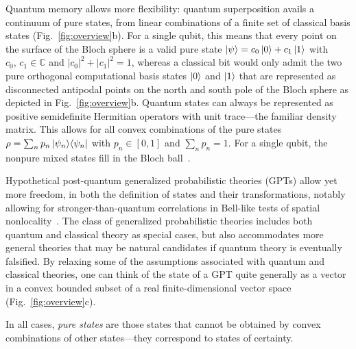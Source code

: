 \documentclass[prx,nofootinbib,onecolumn,showkeys,groupaddress,preprintnumbers,floatfix,
superscriptaddress]{revtex4-1}
\begin{document}
Quantum memory allows more flexibility:
quantum superposition avails a continuum of pure states, 
from linear combinations of a finite set of classical basis states (Fig.~\ref{fig:overview}b).
For a single qubit, this means that every point on the surface of the Bloch sphere is a valid pure state
$\ket{\psi} = c_0 \ket{0} + c_1 \ket{1}$ with $c_0, \, c_1 \in \mathbb{C}$ and $|c_0|^2 + |c_1|^2 = 1$,
whereas a classical bit
would only admit the two pure orthogonal computational basis states $\ket{0}$ and $\ket{1}$
that are represented as disconnected antipodal points on the north and south pole of the Bloch sphere as depicted in Fig.~\ref{fig:overview}b.
Quantum states can always be represented 
as positive semidefinite Hermitian operators with unit trace---the familiar density matrix.
This allows for all convex combinations of the pure states $\rho = \sum_n p_n \ket{\psi_n} \! \bra{\psi_n}$ with $p_n \in [0,1]$ and $\sum_n p_n = 1$.  For a single qubit, the nonpure mixed states fill in the Bloch ball~\cite{Nielsen10_Quantum}.

%

Hypothetical 
post-quantum 
generalized probabilistic
theories (GPTs) allow yet more freedom, 
in both the definition of states and their transformations,
notably allowing for stronger-than-quantum correlations in Bell-like tests of spatial nonlocality~\cite{Plavala23_General}.
The class of generalized probabilistic theories includes both quantum and classical theory as special cases, but also accommodates more general theories that may be natural candidates if quantum theory is eventually falsified. 
By relaxing some of the assumptions associated with quantum and classical theories, 
one can think of the state of a GPT quite generally as a vector in a convex bounded subset of a real finite-dimensional vector space (Fig.~\ref{fig:overview}c).

In all cases, \emph{pure states} are those states that cannot be obtained by convex combinations of other states---they correspond to states of certainty.

\end{document}

